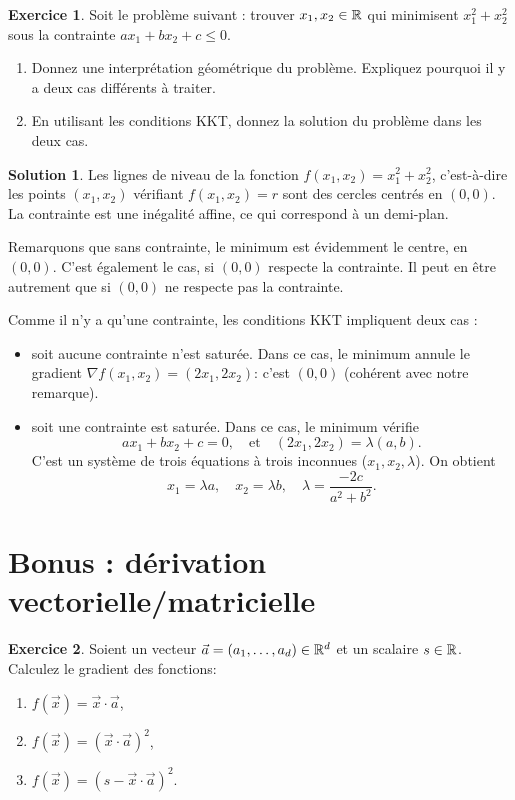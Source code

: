 \documentclass[a4paper,francais]{article}
\newcommand{\R}{{\ensuremath\mathbb{R}}}
\theoremstyle{definition}
\newtheorem{exercice}{Exercice}[section]
\newtheorem*{solution}{Solution}
\begin{document}
\begin{exercice}
  Soit le problème suivant : trouver $x_1, x_2 \in \R$ qui minimisent $x_1^2 + x_2^2$
  sous la contrainte $ax_1 + bx_2 + c \leq 0$. 

  \begin{enumerate}
  \item Donnez une interprétation géométrique du problème. Expliquez pourquoi il y a deux
    cas différents à traiter. 
  \item En utilisant les conditions KKT, donnez la solution du problème dans les deux cas.  
  \end{enumerate}
\end{exercice}

\begin{solution}
  Les lignes de niveau de la fonction $f(x_1,x_2) = x_1^2 + x_2^2$, c'est-à-dire
  les points $(x_1,x_2)$ vérifiant $f(x_1,x_2) = r$ sont des cercles centrés en $(0,0)$. 
  La contrainte est une inégalité affine, ce qui correspond à un demi-plan.

  Remarquons que sans contrainte, le minimum est évidemment le centre, en $(0,0)$.
  C'est également le cas, si $(0,0)$ respecte la contrainte. Il peut en être autrement
  que si $(0,0)$ ne respecte pas la contrainte. 
  
  Comme il n'y a qu'une contrainte, les conditions KKT impliquent deux cas :
  \begin{itemize}
  \item soit aucune contrainte n'est saturée. Dans ce cas, le minimum annule
    le gradient $\nabla f(x_1,x_2) = (2x_1,2x_2)$: c'est $(0,0)$ (cohérent avec notre remarque). 
  \item soit une contrainte est saturée. Dans ce cas, le minimum vérifie
    \[ ax_1+bx_2+c = 0, \quad \text{et} \quad (2x_1,2x_2) = \lambda(a,b). \]
    C'est un système de trois équations à trois inconnues ($x_1, x_2,\lambda$).
    On obtient
    \[ x_1 = \lambda a, \quad x_2 = \lambda b, \quad \lambda = \frac{-2c}{a^2+b^2}. \]
  \end{itemize}
\end{solution}

\section{Bonus : dérivation vectorielle/matricielle}

\begin{exercice}
  Soient un vecteur $\vec{a} = (a_1,\dots,a_d) \in \R^d$ et
  un scalaire $s \in \R$.
  Calculez le gradient des fonctions:
  \begin{enumerate}
  \item $f(\vec{x}) = \vec{x}\cdot\vec{a}$,  
  \item $f(\vec{x}) = (\vec{x}\cdot\vec{a})^2$,
  \item $f(\vec{x}) = (s - \vec{x}\cdot\vec{a})^2$. 
  \end{enumerate}
\end{exercice}
\end{document}
